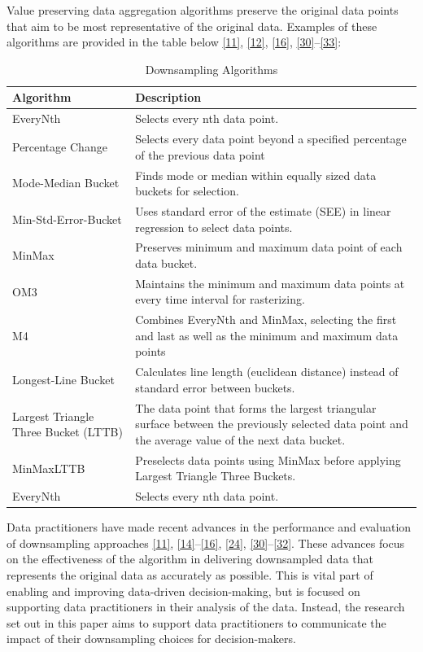 \documentclass{article}
\begin{document}
Value preserving data aggregation algorithms preserve the original data
points that aim to be most representative of the original data. Examples
of these algorithms are provided in the table below
\protect\hyperlink{ref-datapoint}{{[}11{]}},
\protect\hyperlink{ref-Sveinn}{{[}12{]}},
\protect\hyperlink{ref-MinMaxLTTB}{{[}16{]}},
\protect\hyperlink{ref-dashql}{{[}30{]}}--\protect\hyperlink{ref-M4}{{[}33{]}}:

\begin{table}[H]

\caption{\label{tab:unnamed-chunk-1}Downsampling Algorithms}
\centering
\begin{tabular}[t]{l|l}
\hline
Algorithm & Description\\
\hline
EveryNth & Selects every nth data point.\\
\hline
Percentage Change & Selects every data point beyond a specified percentage of the previous data point\\
\hline
Mode-Median Bucket & Finds mode or median within equally sized data buckets for selection.\\
\hline
Min-Std-Error-Bucket & Uses standard error of the estimate (SEE) in linear regression to select data points.\\
\hline
MinMax & Preserves minimum and maximum data point of each data bucket.\\
\hline
OM3 & Maintains the minimum and maximum data points at every time interval for rasterizing.\\
\hline
M4 & Combines EveryNth and MinMax, selecting the first and last as well as the minimum and maximum data points\\
\hline
Longest-Line Bucket & Calculates line length (euclidean distance) instead of standard error between buckets.\\
\hline
Largest Triangle Three Bucket (LTTB) & The data point that forms the largest triangular surface between the previously selected data point and the average value of the next data bucket.\\
\hline
MinMaxLTTB & Preselects data points using MinMax before applying Largest Triangle Three Buckets.\\
\hline
EveryNth & Selects every nth data point.\\
\hline
\end{tabular}
\end{table}

Data practitioners have made recent advances in the performance and
evaluation of downsampling approaches
\protect\hyperlink{ref-datapoint}{{[}11{]}},
\protect\hyperlink{ref-downsampling}{{[}14{]}}--\protect\hyperlink{ref-MinMaxLTTB}{{[}16{]}},
\protect\hyperlink{ref-plotly}{{[}24{]}},
\protect\hyperlink{ref-dashql}{{[}30{]}}--\protect\hyperlink{ref-MinMaxOrdered}{{[}32{]}}.
These advances focus on the effectiveness of the algorithm in delivering
downsampled data that represents the original data as accurately as
possible. This is vital part of enabling and improving data-driven
decision-making, but is focused on supporting data practitioners in
their analysis of the data. Instead, the research set out in this paper
aims to support data practitioners to communicate the impact of their
downsampling choices for decision-makers.
\end{document}
